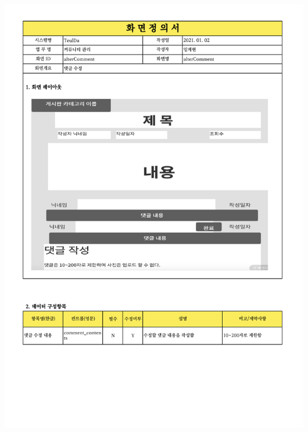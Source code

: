 {{{{{{{{{{{{{{{{{{{{{{{{{{{{{{{{{{{{{{{{{{{{{{{{{{{{{{\includegraphics[width=20cm]{./Figure/Analysis/Display/community/community_13.pdf} \\
}}}}}}}}}}}}}}}}}}}}}}}}}}}}}}}}}}}}}}}}}}}}}}}}}}}}}}
